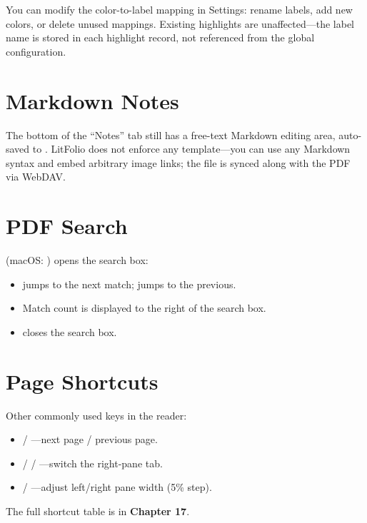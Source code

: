You can modify the color-to-label mapping in Settings: rename labels, add new colors,
or delete unused mappings. Existing highlights are unaffected---the label name is stored
in each highlight record, not referenced from the global configuration.

\section{Markdown Notes}

The bottom of the ``Notes'' tab still has a free-text Markdown editing area, auto-saved
to . LitFolio does not enforce any template---you can use
any Markdown syntax and embed arbitrary image links; the file is synced along with
the PDF via WebDAV.

\section{PDF Search}

 (macOS: ) opens the search box:

\begin{itemize}
  \item {} jumps to the next match;  jumps to the previous.
  \item Match count is displayed to the right of the search box.
  \item {} closes the search box.
\end{itemize}

\section{Page Shortcuts}

Other commonly used keys in the reader:

\begin{itemize}
  \item {} / ---next page / previous page.
  \item {} /  / ---switch the right-pane tab.
  \item \kbd{[} / \kbd{]}---adjust left/right pane width (5\% step).
\end{itemize}

The full shortcut table is in \textbf{Chapter 17}.
